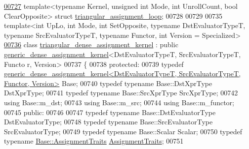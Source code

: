\begin{DoxyCode}
\hyperlink{struct_eigen_1_1internal_1_1triangular__assignment__loop}{00727} \textcolor{keyword}{template}<\textcolor{keyword}{typename} Kernel, \textcolor{keywordtype}{unsigned} \textcolor{keywordtype}{int} Mode, \textcolor{keywordtype}{int} UnrollCount, \textcolor{keywordtype}{bool} ClearOpposite> \textcolor{keyword}{struct }
      \hyperlink{struct_eigen_1_1internal_1_1triangular__assignment__loop}{triangular\_assignment\_loop};
00728 
00729  
00735 \textcolor{keyword}{template}<\textcolor{keywordtype}{int} UpLo, \textcolor{keywordtype}{int} Mode, \textcolor{keywordtype}{int} SetOpposite, \textcolor{keyword}{typename} DstEvaluatorTypeT, \textcolor{keyword}{typename} SrcEvaluatorTypeT, \textcolor{keyword}{
      typename} Functor, \textcolor{keywordtype}{int} Version = Specialized>
\hyperlink{class_eigen_1_1internal_1_1triangular__dense__assignment__kernel}{00736} \textcolor{keyword}{class }\hyperlink{class_eigen_1_1internal_1_1triangular__dense__assignment__kernel}{triangular\_dense\_assignment\_kernel} : \textcolor{keyword}{public} 
      \hyperlink{class_eigen_1_1internal_1_1generic__dense__assignment__kernel}{generic\_dense\_assignment\_kernel}<DstEvaluatorTypeT, SrcEvaluatorTypeT, Functo
      r, Version>
00737 \{
00738 \textcolor{keyword}{protected}:
00739   \textcolor{keyword}{typedef} 
      \hyperlink{class_eigen_1_1internal_1_1generic__dense__assignment__kernel}{generic\_dense\_assignment\_kernel<DstEvaluatorTypeT, SrcEvaluatorTypeT, Functor, Version>}
       Base;
00740   \textcolor{keyword}{typedef} \textcolor{keyword}{typename} Base::DstXprType DstXprType;
00741   \textcolor{keyword}{typedef} \textcolor{keyword}{typename} Base::SrcXprType SrcXprType;
00742   \textcolor{keyword}{using} Base::m\_dst;
00743   \textcolor{keyword}{using} Base::m\_src;
00744   \textcolor{keyword}{using} Base::m\_functor;
00745 \textcolor{keyword}{public}:
00746   
00747   \textcolor{keyword}{typedef} \textcolor{keyword}{typename} Base::DstEvaluatorType DstEvaluatorType;
00748   \textcolor{keyword}{typedef} \textcolor{keyword}{typename} Base::SrcEvaluatorType SrcEvaluatorType;
00749   \textcolor{keyword}{typedef} \textcolor{keyword}{typename} Base::Scalar Scalar;
00750   \textcolor{keyword}{typedef} \textcolor{keyword}{typename} \hyperlink{struct_eigen_1_1internal_1_1copy__using__evaluator__traits}{Base::AssignmentTraits} \hyperlink{struct_eigen_1_1internal_1_1copy__using__evaluator__traits}{AssignmentTraits};
00751   

\end{DoxyCode}
